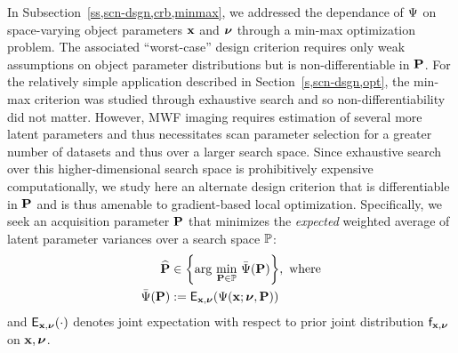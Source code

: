 In Subsection~\ref{ss,scn-dsgn,crb,minmax}, 
we addressed the dependance of $\Psi$ 
on space-varying object parameters $\mathbf{x}$ and $\boldsymbol{\nu}$
through a min-max optimization problem.
The associated ``worst-case'' design criterion 
requires only weak assumptions
on object parameter distributions
but is non-differentiable in $\mathbf{P}$.
For the relatively simple application described
in Section~\ref{s,scn-dsgn,opt},
the min-max criterion was studied 
through exhaustive search
and so non-differentiability did not matter.
However,
MWF imaging requires estimation
of several more latent parameters
and thus necessitates scan parameter selection
for a greater number of datasets
and thus over a larger search space.
Since exhaustive search 
over this higher-dimensional search space
is prohibitively expensive computationally,
we study here an alternate design criterion
that is differentiable in $\mathbf{P}$ 
and is thus amenable 
to gradient-based local optimization.
Specifically,
we seek an acquisition parameter $\mathbf{P}$ 
that minimizes the \emph{expected} weighted average
of latent parameter variances
over a search space $\mathbb{P}$:
\begin{align}
	\est{\bmP} &\in 
		\set{\argmin{\bmP \in \setP} \expcost\paren{\bmP}}, \where
		\label{eq:mwf,P-hat} \\
	\expcost\paren{\bmP} &:= 
		\expect{\bmx,\bmnu}{\costa{\bmx; \bmnu, \bmP}}
		\label{eq:mwf,expcost}
\end{align}
and $\expect{\bmx,\bmnu}{\cdot}$ denotes joint expectation
with respect to prior joint distribution $\mathsf{f}_{\mathbf{x},\boldsymbol{\nu}}$ on $\mathbf{x},\boldsymbol{\nu}$.

